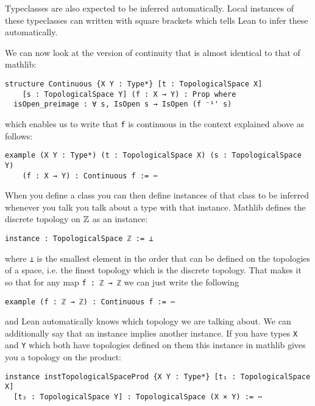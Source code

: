 Typeclasses are also expected to be inferred automatically. 
Local instances of these typeclasses can written with square brackets which tells Lean to infer these automatically.

We can now look at the version of continuity that is almost identical to that of mathlib: 

\begin{lstlisting}
structure Continuous {X Y : Type*} [t : TopologicalSpace X]
    [s : TopologicalSpace Y] (f : X → Y) : Prop where
  isOpen_preimage : ∀ s, IsOpen s → IsOpen (f ⁻¹' s)
\end{lstlisting}

which enables us to write that \lstinline{f} is continuous in the context explained above as follows:

\begin{lstlisting}
example (X Y : Type*) (t : TopologicalSpace X) (s : TopologicalSpace Y) 
    (f : X → Y) : Continuous f := ⋯
\end{lstlisting}

When you define a class you can then define instances of that class to be inferred whenever you talk you talk about a type with that instance. 
Mathlib defines the discrete topology on $\mathbb{Z}$ as an instance: 

\begin{lstlisting}
instance : TopologicalSpace ℤ := ⊥
\end{lstlisting}

where \lstinline{⊥} is the smallest element in the order that can be defined on the topologies of a space, i.e. the finest topology which is the discrete topology. 
That makes it so that for any map \lstinline{f : ℤ → ℤ} we can just write the following

\begin{lstlisting}
example (f : ℤ → ℤ) : Continuous f := ⋯
\end{lstlisting} 

and Lean automatically knows which topology we are talking about. 
We can additionally say that an instance implies another instance. 
If you have types \lstinline{X} and \lstinline{Y} which both have topologies defined on them this instance in mathlib gives you a topology on the product: 

\begin{lstlisting}
instance instTopologicalSpaceProd {X Y : Type*} [t₁ : TopologicalSpace X] 
  [t₂ : TopologicalSpace Y] : TopologicalSpace (X × Y) := ⋯
\end{lstlisting}

